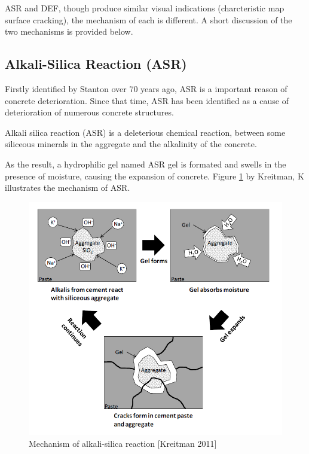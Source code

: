 
ASR and DEF, though produce similar visual indications (charcteristic map surface cracking), the mechanism of each is different. A short discussion of the two mechanisms is provided below.

\subsection{Alkali-Silica Reaction (ASR)}

Firstly identified by Stanton\cite{Stanton} over 70 years ago, ASR is a important reason of concrete deterioration. Since that time, ASR has been identified as a cause of deterioration of numerous concrete structures.


Alkali silica reaction (ASR) is a deleterious chemical reaction, between some siliceous minerals in the aggregate and the alkalinity of the concrete.

As the result, a hydrophilic gel named ASR gel is formated and swells in the presence of moisture, causing the expansion of concrete. Figure \ref{ASR_mechanism} by Kreitman, K\cite{Kreitman} illustrates the mechanism of ASR.


\begin{figure}[ht]
\centering
\includegraphics[width=.8\linewidth]{Reference/Kreitman.png}
  \caption{Mechanism of alkali-silica reaction [Kreitman 2011]}
  \label{ASR_mechanism}
\end{figure}

